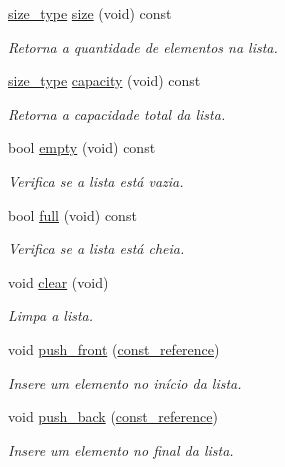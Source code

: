 \begin{DoxyCompactItemize}
\hyperlink{classsc_1_1vector_a48bf37ba1a6d0c13504414d86e27c399}{size\+\_\+type} \hyperlink{classsc_1_1vector_afee521145d4c91a523a4ab3c605296a2}{size} (void) const
\begin{DoxyCompactList}\small\item\em Retorna a quantidade de elementos na lista. \end{DoxyCompactList}\item 
\hyperlink{classsc_1_1vector_a48bf37ba1a6d0c13504414d86e27c399}{size\+\_\+type} \hyperlink{classsc_1_1vector_acf5f0cebfb797dac6eb42523d1e7511a}{capacity} (void) const
\begin{DoxyCompactList}\small\item\em Retorna a capacidade total da lista. \end{DoxyCompactList}\item 
bool \hyperlink{classsc_1_1vector_ae189cd89e598a752b891e55869694f17}{empty} (void) const
\begin{DoxyCompactList}\small\item\em Verifica se a lista está vazia. \end{DoxyCompactList}\item 
bool \hyperlink{classsc_1_1vector_a0a6b379c96b50cf99cbd51306dd2d491}{full} (void) const
\begin{DoxyCompactList}\small\item\em Verifica se a lista está cheia. \end{DoxyCompactList}\item 
void \hyperlink{classsc_1_1vector_a72d20c72613053a3f4bcf2e8e0a9da71}{clear} (void)
\begin{DoxyCompactList}\small\item\em Limpa a lista. \end{DoxyCompactList}\item 
void \hyperlink{classsc_1_1vector_a1e5bdb328b9843ac252fd7f7a2c44e86}{push\+\_\+front} (\hyperlink{classsc_1_1vector_a8da2b1a11b069241100f9b2e14f481a0}{const\+\_\+reference})
\begin{DoxyCompactList}\small\item\em Insere um elemento no início da lista. \end{DoxyCompactList}\item 
void \hyperlink{classsc_1_1vector_af84bdcc9188e61f5ea1d2eecc6b72bee}{push\+\_\+back} (\hyperlink{classsc_1_1vector_a8da2b1a11b069241100f9b2e14f481a0}{const\+\_\+reference})
\begin{DoxyCompactList}\small\item\em Insere um elemento no final da lista. \end{DoxyCompactList}\item 

\end{DoxyCompactItemize}
